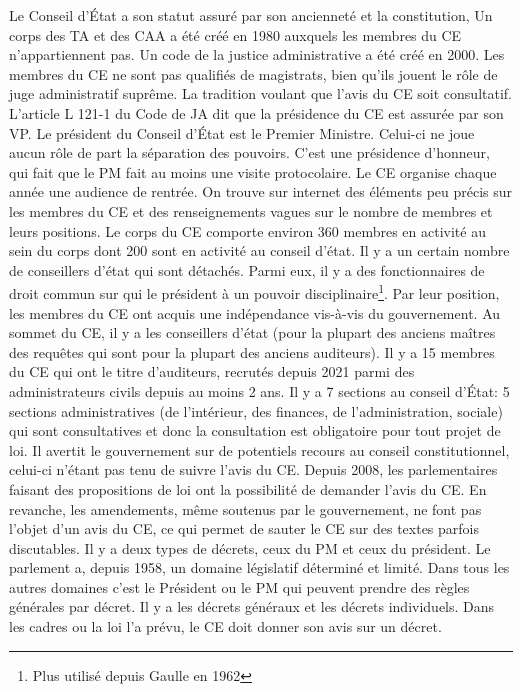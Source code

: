 \documentclass[math]{cours}
\begin{document}
Le Conseil d'État a son statut assuré par son ancienneté et la constitution,
Un corps des TA et des CAA a été créé en 1980 auxquels les membres du CE n'appartiennent pas.
Un code de la justice administrative a été créé en 2000.
Les membres du CE ne sont pas qualifiés de magistrats, bien qu'ils jouent le rôle de juge administratif suprême.
La tradition voulant que l'avis du CE soit consultatif.
L'article L 121-1 du Code de JA dit que la présidence du CE est assurée par son VP.
Le président du Conseil d'État est le Premier Ministre. Celui-ci ne joue aucun rôle de part la séparation des pouvoirs.
C'est une présidence d'honneur, qui fait que le PM fait au moins une visite protocolaire.
Le CE organise chaque année une audience de rentrée.
On trouve sur internet des éléments peu précis sur les membres du CE et des renseignements vagues sur le nombre de membres et leurs positions.
Le corps du CE comporte environ 360 membres en activité au sein du corps dont 200 sont en activité au conseil d'état.
Il y a un certain nombre de conseillers d'état qui sont détachés.
Parmi eux, il y a des fonctionnaires de droit commun sur qui le président à un pouvoir disciplinaire\footnote{Plus utilisé depuis Gaulle en 1962}.
Par leur position, les membres du CE ont acquis une indépendance vis-à-vis du gouvernement.
Au sommet du CE, il y a les conseillers d'état (pour la plupart des anciens maîtres des requêtes qui sont pour la plupart des anciens auditeurs).
Il y a 15 membres du CE qui ont le titre d'auditeurs, recrutés depuis 2021 parmi des administrateurs civils depuis au moins 2 ans.
Il y a 7 sections au conseil d'État: 5 sections administratives (de l'intérieur, des finances, de l'administration, sociale) qui sont consultatives et donc la consultation est obligatoire pour tout projet de loi.
Il avertit le gouvernement sur de potentiels recours au conseil constitutionnel, celui-ci n'étant pas tenu de suivre l'avis du CE.
Depuis 2008, les parlementaires faisant des propositions de loi ont la possibilité de demander l'avis du CE.
En revanche, les amendements, même soutenus par le gouvernement, ne font pas l'objet d'un avis du CE, ce qui permet de sauter le CE sur des textes parfois discutables.
Il y a deux types de décrets, ceux du PM et ceux du président.
Le parlement a, depuis 1958, un domaine législatif déterminé et limité. Dans tous les autres domaines c'est le Président ou le PM qui peuvent prendre des règles générales par décret.
Il y a les décrets généraux et les décrets individuels.
Dans les cadres ou la loi l'a prévu, le CE doit donner son avis sur un décret.
\end{document}
